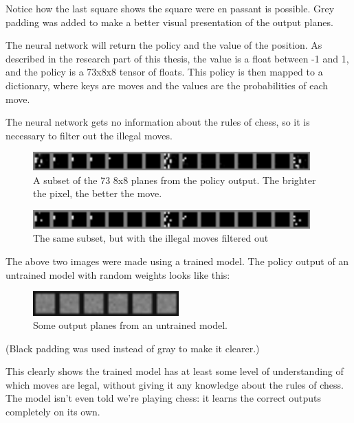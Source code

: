 \documentclass{article}
\begin{document}
Notice how the last square shows the square were en passant is possible.
Grey padding was added to make a better visual presentation of the output planes.

The neural network will return the policy and the value of the position.
As described in the research part of this thesis, the value is a float between -1 and 1, and the 
policy is a 73x8x8 tensor of floats. This policy is then mapped to a dictionary, where keys are moves and 
the values are the probabilities of each move.

The neural network gets no information about the rules of chess, so it is necessary to filter
out the illegal moves. 

\begin{figure}[H]
    \centering
    \includegraphics[width=0.95\textwidth]{img/output-planes/unfiltered.png}
    \caption{A subset of the 73 8x8 planes from the policy output. The brighter the pixel, the better the move.}
\end{figure}

\begin{figure}[H]
    \centering
    \includegraphics[width=0.95\textwidth]{img/output-planes/filtered.png}
    \caption{The same subset, but with the illegal moves filtered out}
\end{figure}

The above two images were made using a trained model. The policy output of an untrained model with random weights 
looks like this:

\begin{figure}[H]
    \centering
    \includegraphics[width=0.5\textwidth]{img/output-planes/random-model-unfiltered.png}
    \caption{Some output planes from an untrained model.}
\end{figure}

(Black padding was used instead of gray to make it clearer.)

This clearly shows the trained model has at least some level of understanding of which moves are legal, 
without giving it any knowledge about the rules of chess. The model isn't even told we're playing chess: it
learns the correct outputs completely on its own. 
\end{document}
